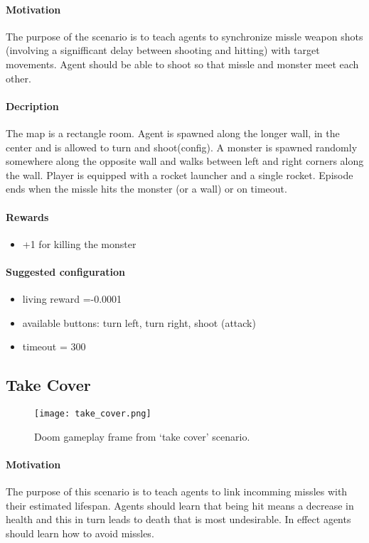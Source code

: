 		\paragraph{Motivation} 
			The purpose of the scenario is to teach agents to synchronize missle weapon shots (involving a signifficant delay between shooting and hitting) with target movements. Agent should be able to shoot so that missle and monster meet each other.

		\paragraph{Decription}
			The map is a rectangle room. Agent is spawned along the longer wall, in the center and is allowed to turn and shoot(config). A monster is spawned randomly somewhere along the opposite wall and walks between left and right corners along the wall. Player is equipped with a rocket launcher and a single rocket. Episode ends when the missle hits the monster (or a wall) or on timeout.
		\paragraph{Rewards}
		\begin{itemize}
			\item +1 for killing the monster
		\end{itemize}
		
		\paragraph{Suggested configuration}
		\begin{itemize}
			\item living reward =-0.0001
			\item available buttons: turn left, turn right, shoot (attack)
			\item timeout = 300
		\end{itemize}
	\newpage

	\subsection{Take Cover}
		\begin{figure}
			\centering
			\texttt{[image: take\_cover.png]}
			\caption{Doom gameplay frame from `take cover' scenario.}
		\end{figure}
		\paragraph{Motivation} 
			The purpose of this scenario is to teach agents to link incomming missles with their estimated lifespan. Agents should learn that being hit means a decrease in health and this in turn leads to death that is most undesirable. In effect agents should learn how to avoid missles.

